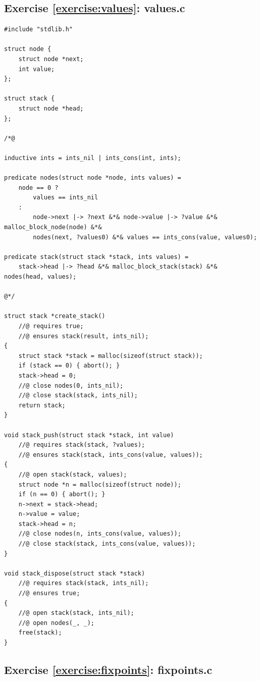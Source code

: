 \documentclass{article}
\begin{document}
\subsection{Exercise
\ref{exercise:values}: values.c}\label{solution:values}

\begin{lstlisting}
#include "stdlib.h"

struct node {
    struct node *next;
    int value;
};

struct stack {
    struct node *head;
};

/*@

inductive ints = ints_nil | ints_cons(int, ints);

predicate nodes(struct node *node, ints values) =
    node == 0 ?
        values == ints_nil
    :
        node->next |-> ?next &*& node->value |-> ?value &*& malloc_block_node(node) &*&
        nodes(next, ?values0) &*& values == ints_cons(value, values0);

predicate stack(struct stack *stack, ints values) =
    stack->head |-> ?head &*& malloc_block_stack(stack) &*& nodes(head, values);

@*/

struct stack *create_stack()
    //@ requires true;
    //@ ensures stack(result, ints_nil);
{
    struct stack *stack = malloc(sizeof(struct stack));
    if (stack == 0) { abort(); }
    stack->head = 0;
    //@ close nodes(0, ints_nil);
    //@ close stack(stack, ints_nil);
    return stack;
}

void stack_push(struct stack *stack, int value)
    //@ requires stack(stack, ?values);
    //@ ensures stack(stack, ints_cons(value, values));
{
    //@ open stack(stack, values);
    struct node *n = malloc(sizeof(struct node));
    if (n == 0) { abort(); }
    n->next = stack->head;
    n->value = value;
    stack->head = n;
    //@ close nodes(n, ints_cons(value, values));
    //@ close stack(stack, ints_cons(value, values));
}

void stack_dispose(struct stack *stack)
    //@ requires stack(stack, ints_nil);
    //@ ensures true;
{
    //@ open stack(stack, ints_nil);
    //@ open nodes(_, _);
    free(stack);
}
\end{lstlisting}

\subsection{Exercise
\ref{exercise:fixpoints}: fixpoints.c}\label{solution:fixpoints}
\end{document}
